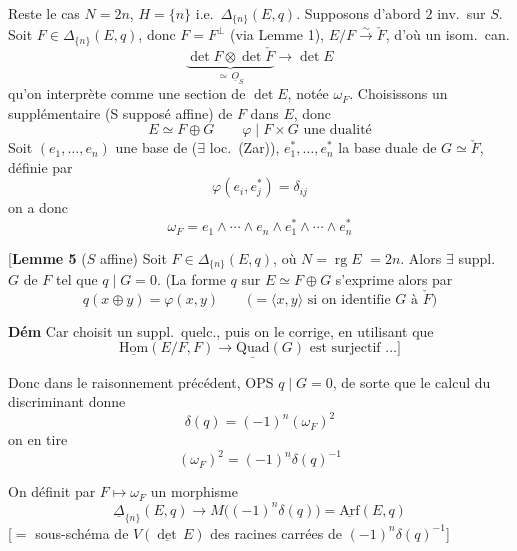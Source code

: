 \documentclass[11pt,a4paper]{article}
\begin{document}
\struck{(\ill{})}

Reste le cas $N = 2n$,  $H = \{n\}$ i.e.\ $\Delta_{\{n\}}(E,q)$.
 Supposons d'abord $2$ inv.\ sur $S$. Soit $F \in \Delta_{\{n\}}(E,q)$,
\struck{\ill{}} donc $F = F^{\perp}$ (via Lemme 1), 
$E/F \xrightarrow{\sim} \check{F}$, d'où un isom.\ can.
\[
  \underbrace{\det F \otimes \det \check{F}}_{\simeq\, \underline{O}_S} \longrightarrow \det E
\]
qu'on interprète comme une section de $\det E$, notée $\omega_F$. Choisissons un
supplémentaire  (S supposé affine) de $F$ dans $E$, donc
\[
  E \simeq F \oplus G \qquad \varphi \mid F \times G \text{ une dualité}
\]
Soit $(e_1, \ldots, e_n)$ une base de  ($\exists$ loc.\ (Zar)),
$e_1^{*}, \ldots, e_n^{*}$ la base duale \struck{\ill{}} de $G \simeq \check{F}$,
définie par
\[
  \varphi(e_i, e_j^{*}) = \delta_{ij}
\]
on a donc
\[
  \omega_F = e_1 \wedge \cdots \wedge e_n \wedge e_1^{*} \wedge \cdots \wedge e_n^{*}
\]

[\textbf{Lemme 5} ($S$ affine) Soit $F \in \Delta_{\{n\}}(E,q)$, où
$N = \operatorname{rg} E$ \struck{\ill{}} $= 2n$. Alors $\exists$ suppl.\ $G$ de $F$ tel
que $q \mid G = 0$. (La forme $q$ sur $E \simeq F \oplus G$ s'exprime alors par
\[
  q(x \oplus y) = \varphi(x,y) \qquad
  \bigl(= \langle x, y\rangle \text{ si on identifie } G \text{ à } \check{F}\bigr)
\]

\textbf{Dém} Car choisit un suppl.\ quelc., puis on le corrige, en utilisant que
\[
  \underline{\mathrm{Hom}}(E/F, F) \longrightarrow \underline{\mathrm{Quad}}(G)
  \text{ est surjectif …}]
\]

Donc dans le raisonnement précédent, OPS $q \mid G = 0$, de sorte que le calcul du
discriminant donne
\[
  \delta(q) = (-1)^n (\omega_F)^2
\]
on en tire
\[
  \boxed{(\omega_F)^2 = (-1)^n \delta(q)^{-1}}
\]

 On définit par $F \mapsto \omega_F$ un morphisme
\[
  \underline{\Delta}_{\{n\}}(E,q) \longrightarrow M\bigl((-1)^n \delta(q)\bigr)
  = \underline{\mathrm{Arf}}(E,q)
\]
[$=$ sous-schéma de $V(\underline{\det}\, E)$ des racines carrées de
$(-1)^n \delta(q)^{-1}$]
\end{document}
